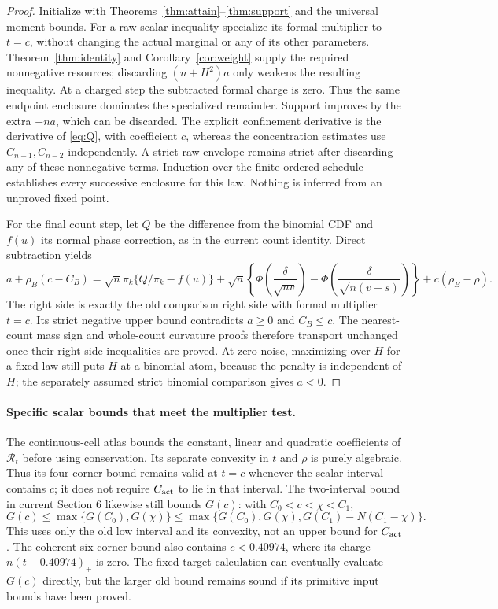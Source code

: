 \begin{proof}
Initialize with Theorems~\ref{thm:attain}--\ref{thm:support} and the
universal moment bounds. For a raw scalar inequality specialize its
formal multiplier to $t=c$, without changing the actual marginal or any
of its other parameters. Theorem~\ref{thm:identity} and
Corollary~\ref{cor:weight} supply the required nonnegative resources;
discarding $(n+H^2)a$ only weakens the resulting inequality. At a charged
step the subtracted formal charge is zero. Thus the same endpoint
enclosure dominates the specialized remainder. Support improves by the
extra $-na$, which can be discarded. The explicit confinement derivative
is the derivative of \eqref{eq:Q}, with coefficient $c$, whereas the
concentration estimates use $C_{n-1},C_{n-2}$ independently. A strict
raw envelope remains strict after discarding any of these nonnegative
terms. Induction over the finite ordered schedule establishes every
successive enclosure for this law. Nothing is inferred from an unproved
fixed point.

For the final count step, let $Q$ be the difference from the binomial
CDF and $f(u)$ its normal phase correction, as in the current count
identity. Direct subtraction yields
\begin{equation}\label{eq:transport-master}
 a+\rho_B(c-C_B)=\sqrt n\pi_k\{Q/\pi_k-f(u)\}
 +\sqrt n\left\{\Phi\!\left(\frac{\delta}{\sqrt{nv}}\right)
  -\Phi\!\left(\frac{\delta}{\sqrt{n(v+s)}}\right)\right\}
 +c(\rho_B-\rho).
\end{equation}
The right side is exactly the old comparison right side with formal
multiplier $t=c$. Its strict negative upper bound contradicts $a\ge0$
and $C_B\le c$. The nearest-count mass sign and whole-count curvature
proofs therefore transport unchanged once their right-side inequalities
are proved. At zero noise, maximizing over $H$ for a fixed law still
puts $H$ at a binomial atom, because the penalty is independent of $H$;
the separately assumed strict binomial comparison gives $a<0$.
\end{proof}

\paragraph{Specific scalar bounds that meet the multiplier test.}
The continuous-cell atlas bounds the constant, linear and quadratic
coefficients of $\mathscr R_t$ before using conservation. Its separate
convexity in $t$ and $\rho$ is purely algebraic. Thus its four-corner
bound remains valid at $t=c$ whenever the scalar interval contains $c$;
it does not require $C_{\rm act}$ to lie in that interval.
The two-interval bound in current Section 6 likewise still bounds
$G(c)$: with $C_0<c<\chi<C_1$,
\[
 G(c)\le\max\{G(C_0),G(\chi)\}
 \le\max\{G(C_0),G(\chi),G(C_1)-N(C_1-\chi)\}.
\]
This uses only the old low interval and its convexity, not an upper
bound for $C_{\rm act}$. The coherent six-corner bound also contains
$c<0.40974$, where its charge $n(t-0.40974)_+$ is zero. The fixed-target
calculation can eventually evaluate $G(c)$ directly, but the larger old
bound remains sound if its primitive input bounds have been proved.

